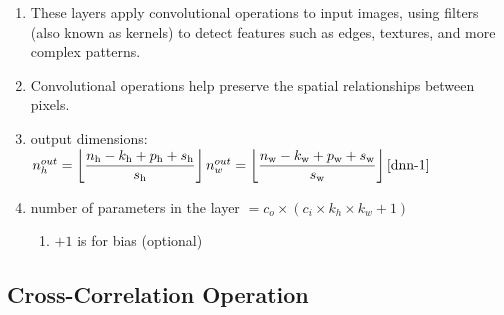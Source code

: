 \begin{enumerate}[itemsep=0.2cm]
    \item These layers apply convolutional operations to input images, using filters (also known as kernels) to detect features such as edges, textures, and more complex patterns. 
    
    \item Convolutional operations help preserve the spatial relationships between pixels.

    \item[] output dimensions: 
    $
        \hfill
        n^{out}_h=\dfloor{\dfrac{n_\textrm{h}-k_\textrm{h}+p_\textrm{h}+s_\textrm{h}}{s_\textrm{h}}}
        \hfill 
        n^{out}_w=\dfloor{\dfrac{n_\textrm{w}-k_\textrm{w}+p_\textrm{w}+s_\textrm{w}}{s_\textrm{w}}}
        \hfill
        \text{\cite{dnn-1}}
    $

    \item[] number of parameters in the layer $= c_o \times ( c_i \times k_h \times k_w + 1)$
    \begin{enumerate}
        \item $+1$ is for bias (optional)

    \end{enumerate}
\end{enumerate}


\subsection{Cross-Correlation Operation \cite{dnn-1}} \label{Cross-Correlation Operation}

